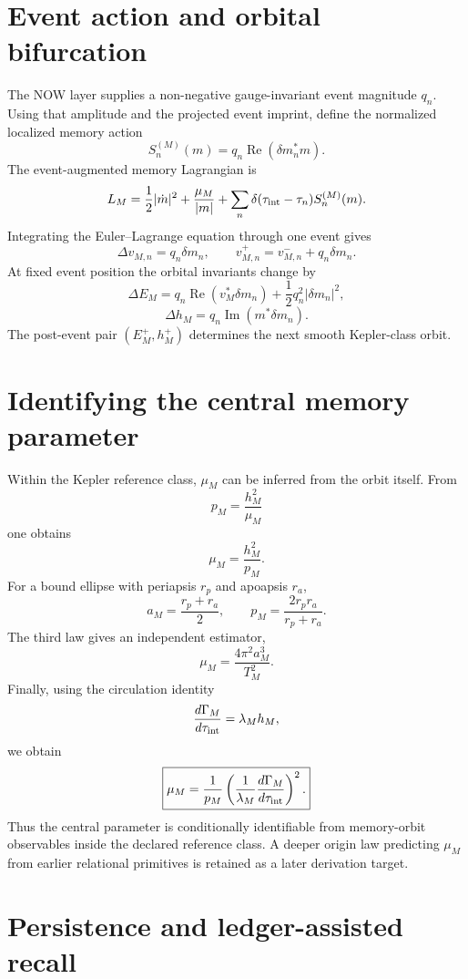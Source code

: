 \section{Event action and orbital bifurcation}

The NOW layer supplies a non-negative gauge-invariant event magnitude \(q_n\). Using that amplitude and the projected event imprint, define the normalized localized memory action
\[
\boxed{
S_n^{(M)}(m)
=q_n\operatorname{Re}(\delta m_n^*m).
}
\]
The event-augmented memory Lagrangian is
\[
L_M
=\frac12|\dot m|^2+\frac{\mu_M}{|m|}
+\sum_n\delta(\tau_{\rm int}-\tau_n)S_n^{(M)}(m).
\]
Integrating the Euler--Lagrange equation through one event gives
\[
\boxed{
\Delta v_{M,n}=q_n\delta m_n,
\qquad
v_{M,n}^+=v_{M,n}^-+q_n\delta m_n.
}
\]
At fixed event position the orbital invariants change by
\[
\boxed{
\Delta E_M
=q_n\operatorname{Re}(v_M^*\delta m_n)
+\frac12q_n^2|\delta m_n|^2,
}
\]
\[
\boxed{
\Delta h_M=q_n\operatorname{Im}(m^*\delta m_n).
}
\]
The post-event pair \((E_M^+,h_M^+)\) determines the next smooth Kepler-class orbit.

\section{Identifying the central memory parameter}

Within the Kepler reference class, \(\mu_M\) can be inferred from the orbit itself. From
\[
p_M=\frac{h_M^2}{\mu_M}
\]
one obtains
\[
\boxed{\mu_M=\frac{h_M^2}{p_M}}.
\]
For a bound ellipse with periapsis \(r_p\) and apoapsis \(r_a\),
\[
a_M=\frac{r_p+r_a}{2},
\qquad
p_M=\frac{2r_pr_a}{r_p+r_a}.
\]
The third law gives an independent estimator,
\[
\boxed{\mu_M=\frac{4\pi^2a_M^3}{T_M^2}}.
\]
Finally, using the circulation identity
\[
\frac{d\Gamma_M}{d\tau_{\rm int}}=\lambda_M h_M,
\]
we obtain
\[
\boxed{
\mu_M
=\frac{1}{p_M}
\left(
\frac{1}{\lambda_M}
\frac{d\Gamma_M}{d\tau_{\rm int}}
\right)^2.
}
\]
Thus the central parameter is conditionally identifiable from memory-orbit observables inside the declared reference class. A deeper origin law predicting \(\mu_M\) from earlier relational primitives is retained as a later derivation target.

\section{Persistence and ledger-assisted recall}

